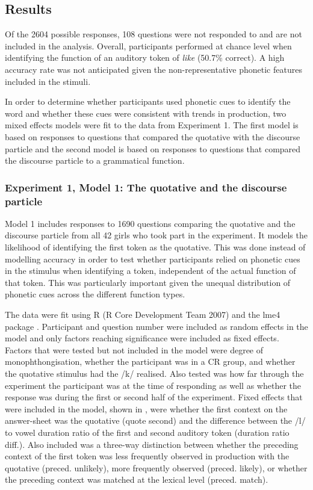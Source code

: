 

\subsection{Results}
Of the 2604 possible responses, 108 questions were not responded to and are not included in the analysis. Overall, participants performed at chance level when identifying the function of an auditory token of \textit{like} (50.7\% correct). A high accuracy rate was not anticipated given the non-representative phonetic features included in the stimuli.

In order to determine whether participants used phonetic cues to identify the word and whether these cues were consistent with trends in production, two mixed effects models were fit to the data from Experiment 1. The first model is based on responses to questions that compared the quotative with the discourse particle and the second model is based on responses to questions that compared the discourse particle to a grammatical function.


\subsubsection{Experiment 1, Model 1: The quotative and the discourse particle}

Model 1 includes responses to 1690 questions comparing the quotative and the discourse particle from all 42 girls who took part in the experiment. It models the likelihood of identifying the first token as the quotative. This was done instead of modelling accuracy in order to test whether participants relied on phonetic cues in the stimulus when identifying a token, independent of the actual function of that token. This was particularly important given the unequal distribution of phonetic cues across the different function types.

The data were fit using R (R Core Development Team 2007) and the lme4 package \citep{lme4}.  Participant and question num\-ber were in\-cluded as ran\-dom effects in the mo\-del and only factors reaching significance were included as fixed effects. Fac\-tors that were test\-ed but not in\-cluded in the mo\-del were de\-gree of mo\-noph\-thong\-isa\-tion, whether the participant was in a CR group, and whether the quotative stimulus had the /k/ realised. Also tested was how far through the experiment the participant was at the time of responding as well as whether the response was during the first or second half of the experiment. Fixed effects that were included in the model, shown in , were whether the first context on the answer-sheet was the quotative (quote second) and the difference between the /l/ to vowel duration ratio of the first and second auditory token (duration ratio diff.). Also included was a three-way distinction between whether the preceding context of the first token was less frequently observed in production with the quotative (preced. unlikely), more frequently observed (preced. likely), or whether the preceding context was matched at the lexical level (preced. match). 

